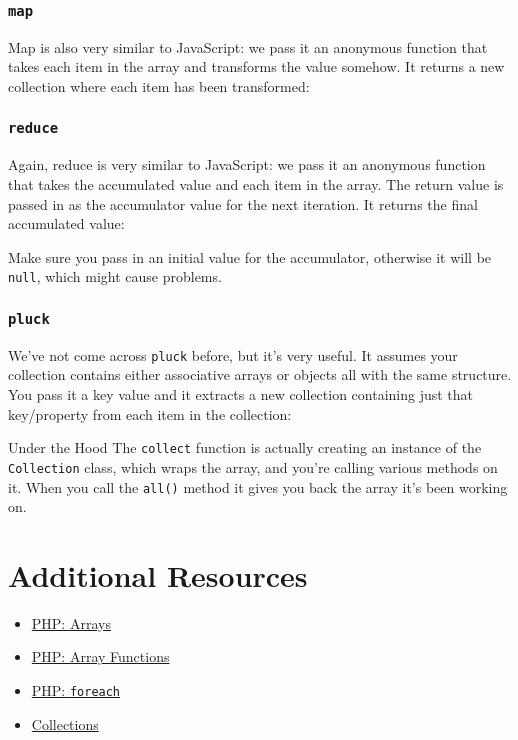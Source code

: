 
\subsubsection{\texttt{map}}

Map is also very similar to JavaScript: we pass it an anonymous function that takes each item in the array and transforms the value somehow. It returns a new collection where each item has been transformed:


\pagebreak

\subsubsection{\texttt{reduce}}

Again, reduce is very similar to JavaScript: we pass it an anonymous function that takes the accumulated value and each item in the array. The return value is passed in as the accumulator value for the next iteration. It returns the final accumulated value:


Make sure you pass in an initial value for the accumulator, otherwise it will be \texttt{null}, which might cause problems.

\subsubsection{\texttt{pluck}}

We've not come across \texttt{pluck} before, but it's very useful. It assumes your collection contains either associative arrays or objects all with the same structure. You pass it a key value and it extracts a new collection containing just that key/property from each item in the collection:



\begin{infobox}{Under the Hood}
    The \texttt{collect} function is actually creating an instance of the \texttt{Collection} class, which wraps the array, and you're calling various methods on it. When you call the \texttt{all()} method it gives you back the array it's been working on.
\end{infobox}


\section{Additional Resources}

\begin{itemize}[leftmargin=*]
    \item \href{http://www.php.net/manual/en/language.types.array.php}{PHP: Arrays}
    \item \href{https://www.php.net/manual/en/ref.array.php}{PHP: Array Functions}
    \item \href{http://www.php.net/manual/en/control-structures.foreach.php}{PHP: \texttt{foreach}}
    \item \href{http://laravel.com/docs/master/collections}{Collections}
\end{itemize}
